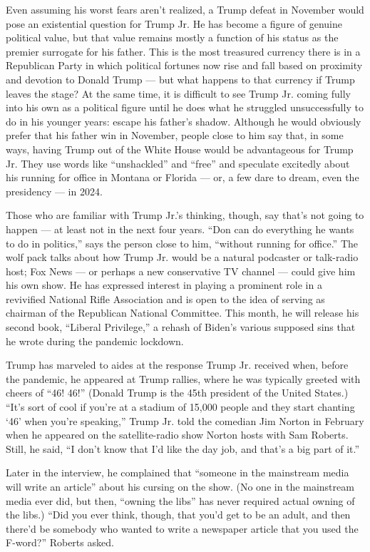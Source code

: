 Even assuming his worst fears aren't realized, a Trump defeat in
November would pose an existential question for Trump Jr. He has become
a figure of genuine political value, but that value remains mostly a
function of his status as the premier surrogate for his father. This is
the most treasured currency there is in a Republican Party in which
political fortunes now rise and fall based on proximity and devotion to
Donald Trump --- but what happens to that currency if Trump leaves the
stage? At the same time, it is difficult to see Trump Jr. coming fully
into his own as a political figure until he does what he struggled
unsuccessfully to do in his younger years: escape his father's shadow.
Although he would obviously prefer that his father win in November,
people close to him say that, in some ways, having Trump out of the
White House would be advantageous for Trump Jr. They use words like
``unshackled'' and ``free'' and speculate excitedly about his running
for office in Montana or Florida --- or, a few dare to dream, even the
presidency --- in 2024.

Those who are familiar with Trump Jr.'s thinking, though, say that's not
going to happen --- at least not in the next four years. ``Don can do
everything he wants to do in politics,'' says the person close to him,
``without running for office.'' The wolf pack talks about how Trump Jr.
would be a natural podcaster or talk-radio host; Fox News --- or perhaps
a new conservative TV channel --- could give him his own show. He has
expressed interest in playing a prominent role in a revivified National
Rifle Association and is open to the idea of serving as chairman of the
Republican National Committee. This month, he will release his second
book, ``Liberal Privilege,'' a rehash of Biden's various supposed sins
that he wrote during the pandemic lockdown.

Trump has marveled to aides at the response Trump Jr. received when,
before the pandemic, he appeared at Trump rallies, where he was
typically greeted with cheers of ``46! 46!'' (Donald Trump is the 45th
president of the United States.) ``It's sort of cool if you're at a
stadium of 15,000 people and they start chanting `46' when you're
speaking,'' Trump Jr. told the comedian Jim Norton in February when he
appeared on the satellite-radio show Norton hosts with Sam Roberts.
Still, he said, ``I don't know that I'd like the day job, and that's a
big part of it.''

Later in the interview, he complained that ``someone in the mainstream
media will write an article'' about his cursing on the show. (No one in
the mainstream media ever did, but then, ``owning the libs'' has never
required actual owning of the libs.) ``Did you ever think, though, that
you'd get to be an adult, and then there'd be somebody who wanted to
write a newspaper article that you used the F-word?'' Roberts asked.

